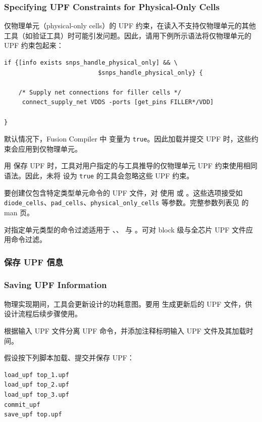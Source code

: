 \subsubsection*{Specifying UPF Constraints for Physical-Only Cells}

仅物理单元（physical-only cells）的 UPF 约束，在读入不支持仅物理单元的其他工具（如验证工具）时可能引发问题。因此，请用下例所示语法将仅物理单元的 UPF 约束包起来：
\begin{lstlisting}
if {[info exists snps_handle_physical_only] && \
                          $snps_handle_physical_only} {

    /* Supply net connections for filler cells */
     connect_supply_net VDDS -ports [get_pins FILLER*/VDD]

}
\end{lstlisting}

默认情况下，Fusion Compiler 中  变量为 \texttt{true}。因此加载并提交 UPF 时，这些约束会应用到仅物理单元。

用  保存 UPF 时，工具对用户指定的与工具推导的仅物理单元 UPF 约束使用相同语法。因此，未将  设为 \texttt{true} 的工具会忽略这些 UPF 约束。

要创建仅包含特定类型单元命令的 UPF 文件，对  使用  或 。这些选项接受如 \texttt{diode\_cells}、\texttt{pad\_cells}、\texttt{physical\_only\_cells} 等参数。完整参数列表见  的 man 页。

对指定单元类型的命令过滤适用于 、、 与 。可对 block 级与全芯片 UPF 文件应用命令过滤。

\subsubsection{保存 UPF 信息}
\subsubsection*{Saving UPF Information}

物理实现期间，工具会更新设计的功耗意图。要用  生成更新后的 UPF 文件，供设计流程后续步骤使用。

 根据输入 UPF 文件分离 UPF 命令，并添加注释标明输入 UPF 文件及其加载时间。

假设按下列脚本加载、提交并保存 UPF：
\begin{lstlisting}
load_upf top_1.upf
load_upf top_2.upf
load_upf top_3.upf
commit_upf
save_upf top.upf
\end{lstlisting}

